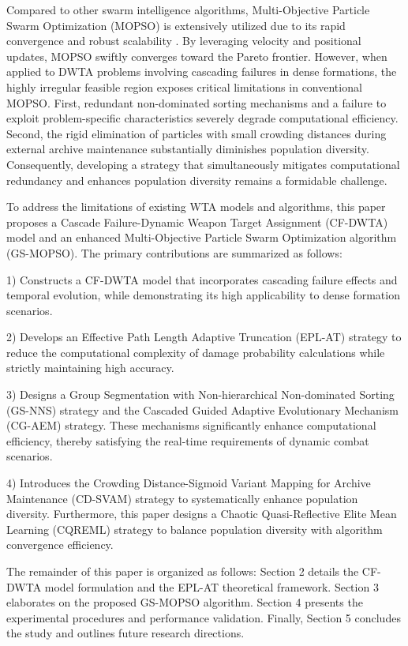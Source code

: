 \documentclass[lettersize,journal]{IEEEtran}
\begin{document}
Compared to other swarm intelligence algorithms, Multi-Objective Particle Swarm Optimization (MOPSO) is extensively utilized due to its rapid convergence and robust scalability \cite{chen2025correlation}. By leveraging velocity and positional updates, MOPSO swiftly converges toward the Pareto frontier. However, when applied to DWTA problems involving cascading failures in dense formations, the highly irregular feasible region exposes critical limitations in conventional MOPSO. First, redundant non-dominated sorting mechanisms and a failure to exploit problem-specific characteristics severely degrade computational efficiency. Second, the rigid elimination of particles with small crowding distances during external archive maintenance substantially diminishes population diversity. Consequently, developing a strategy that simultaneously mitigates computational redundancy and enhances population diversity remains a formidable challenge.

To address the limitations of existing WTA models and algorithms, this paper proposes a Cascade Failure-Dynamic Weapon Target Assignment (CF-DWTA) model and an enhanced Multi-Objective Particle Swarm Optimization algorithm (GS-MOPSO). The primary contributions are summarized as follows:

1) Constructs a CF-DWTA model that incorporates cascading failure effects and temporal evolution, while demonstrating its high applicability to dense formation scenarios.

2) Develops an Effective Path Length Adaptive Truncation (EPL-AT) strategy to reduce the computational complexity of damage probability calculations while strictly maintaining high accuracy.

3) Designs a Group Segmentation with Non-hierarchical Non-dominated Sorting (GS-NNS) strategy and the Cascaded Guided Adaptive Evolutionary Mechanism (CG-AEM) strategy. These mechanisms significantly enhance computational efficiency, thereby satisfying the real-time requirements of dynamic combat scenarios.

4) Introduces the Crowding Distance-Sigmoid Variant Mapping
for Archive Maintenance (CD-SVAM) strategy to systematically enhance population diversity. Furthermore, this paper designs a Chaotic Quasi-Reflective Elite Mean Learning (CQREML) strategy to balance population diversity with algorithm convergence efficiency.

The remainder of this paper is organized as follows: Section 2 details the CF-DWTA model formulation and the EPL-AT theoretical framework. Section 3 elaborates on the proposed GS-MOPSO algorithm. Section 4 presents the experimental procedures and performance validation. Finally, Section 5 concludes the study and outlines future research directions.
\end{document}
